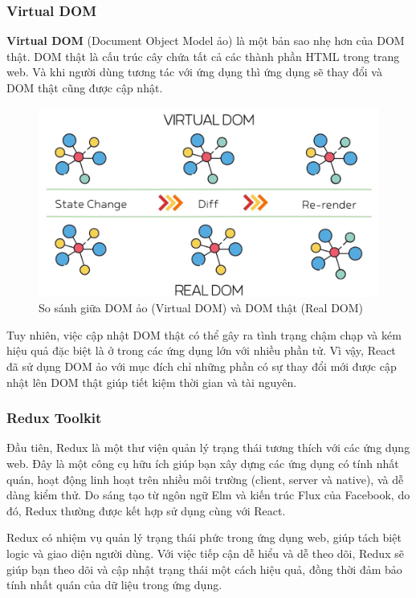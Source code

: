 \subsubsection{Virtual DOM}
\textbf{Virtual DOM} (Document Object Model ảo) là một bản sao nhẹ hơn của DOM thật. DOM thật là cấu trúc cây chứa tất cả các thành phần HTML trong trang web. Và khi người dùng tương tác với ứng dụng thì ứng dụng sẽ thay đổi và DOM thật cũng được cập nhật.

\begin{figure}[htp!]
    \centering
    \includegraphics[scale=0.35]{img/Virtual-DOM.png}
    \caption{So sánh giữa DOM ảo (Virtual DOM) và DOM thật (Real DOM)}
    \label{fig:virtualDOM}
\end{figure}

Tuy nhiên, việc cập nhật DOM thật có thể gây ra tình trạng chậm chạp và kém hiệu quả đặc biệt là ở trong các ứng dụng lớn với nhiều phần tử. Vì vậy, React đã sử dụng DOM ảo với mục đích chỉ những phần có sự thay đổi mới được cập nhật lên DOM thật giúp tiết kiệm thời gian và tài nguyên.

\subsubsection{Redux Toolkit}
Đầu tiên, Redux là một thư viện quản lý trạng thái tương thích với các ứng dụng web. Đây là một công cụ hữu ích giúp bạn xây dựng các ứng dụng có tính nhất quán, hoạt động linh hoạt trên nhiều môi trường (client, server và native), và dễ dàng kiểm thử. Do sáng tạo từ ngôn ngữ Elm và kiến trúc Flux của Facebook,  do đó, Redux thường được kết hợp sử dụng cùng với React.

Redux có nhiệm vụ quản lý trạng thái phức trong ứng dụng web, giúp tách biệt logic và giao diện người dùng. Với việc tiếp cận dễ hiểu và dễ theo dõi, Redux sẽ giúp bạn theo dõi và cập nhật trạng thái một cách hiệu quả, đồng thời đảm bảo tính nhất quán của dữ liệu trong ứng dụng.

